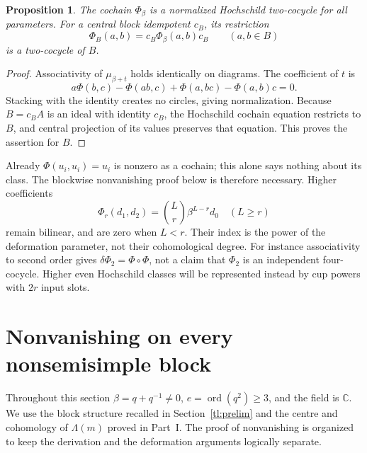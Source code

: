 \documentclass[a4paper,11pt,oneside,reqno]{amsart}
\newtheorem{proposition}[theorem]{Proposition}
\theoremstyle{definition}
\numberwithin{equation}{section}
\begin{document}
	\begin{proposition}\label{tl:Phi-cocycle}
		The cochain $\Phi_\beta$ is a normalized Hochschild two-cocycle for
		all parameters.  For a central block idempotent $c_B$, its restriction
		\begin{equation}\label{tl:Phi-block}
			\Phi_B(a,b)=c_B\Phi_\beta(a,b)c_B\qquad(a,b\in B)
		\end{equation}
		is a two-cocycle of $B$.
	\end{proposition}
	\begin{proof}
		Associativity of $\mu_{\beta+t}$ holds identically on diagrams.
		The coefficient of $t$ is
		\[
		a\Phi(b,c)-\Phi(ab,c)+\Phi(a,bc)-\Phi(a,b)c=0.
		\]
		Stacking with the identity creates no circles, giving normalization.
		Because $B=c_BA$ is an ideal with identity $c_B$, the Hochschild
	cochain equation restricts to $B$, and central projection of its
	values preserves that equation. This proves the assertion for $B$.
	\end{proof}
	
	Already $\Phi(u_i,u_i)=u_i$ is nonzero as a cochain; this alone says
	nothing about its class.  The blockwise nonvanishing proof below is
	therefore necessary.  Higher coefficients
	\[
	\Phi_r(d_1,d_2)=\binom Lr\beta^{L-r}d_0\quad(L\ge r)
	\]
	remain bilinear, and are zero when $L<r$.  Their index is the power
	of the deformation parameter, not their cohomological degree.
	For instance associativity to second order gives
	$\delta\Phi_2=\Phi\circ\Phi$, not a claim that $\Phi_2$ is an
	independent four-cocycle.  Higher even Hochschild classes will be
	represented instead by cup powers with $2r$ input slots.
	
	\section{Nonvanishing on every nonsemisimple block}\label{tl:blocknonzero}
	Throughout this section $\beta=q+q^{-1}\ne0$,
	$e=\operatorname{ord}(q^2)\ge3$, and the field is $\mathbb C$.
	We use the block structure recalled in Section~\ref{tl:prelim} and
	the centre and cohomology of $\Lambda(m)$ proved in Part~I.
	The proof of nonvanishing is organized to keep the derivation and
	the deformation arguments logically separate.
	
\end{document}

